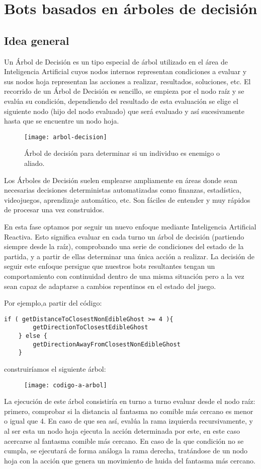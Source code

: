 \chapter{Bots basados en árboles de decisión}

\section{Idea general}
Un Árbol de Decisión es un tipo especial de árbol utilizado en el área de Inteligencia Artificial cuyos nodos internos representan condiciones a evaluar y sus nodos hoja representan las acciones a realizar, resultados, soluciones, etc. El recorrido de un Árbol de Decisión es sencillo, se empieza por el nodo raíz y se evalúa su condición, dependiendo del resultado de esta evaluación se elige el siguiente nodo (hijo del nodo evaluado) que será evaluado y así sucesivamente hasta que se encuentre un nodo hoja.
\begin{figure}[H]
\centering
\texttt{[image: arbol-decision]}
\caption{Árbol de decisión para determinar si un individuo es enemigo o aliado.}
\end{figure}

Los Árboles de Decisión suelen emplearse ampliamente en áreas donde sean necesarias decisiones deterministas automatizadas como finanzas, estadística, videojuegos, aprendizaje automático, etc. Son fáciles de entender y muy rápidos de procesar una vez construidos\cite{aihorizonDecisiontrees}.

En esta fase optamos por seguir un nuevo enfoque mediante Inteligencia Artificial Reactiva. Esto significa evaluar en cada turno un árbol de decisión (partiendo siempre desde la raíz), comprobando una serie de condiciones del estado de la partida, y a partir de ellas determinar una única acción a realizar. La decisión de seguir este enfoque persigue que nuestros bots resultantes tengan un comportamiento con continuidad dentro de una misma situación pero a la vez sean capaz de adaptarse a cambios repentinos en el estado del juego. 
 
Por ejemplo,a partir del código:
\begin{lstlisting}[frame=single, breaklines=no, basicstyle=\fontsize{10}{11}\ttfamily]
    if ( getDistanceToClosestNonEdibleGhost >= 4 ){
        getDirectionToClosestEdibleGhost
    } else {
        getDirectionAwayFromClosestNonEdibleGhost
    }
\end{lstlisting}

construiríamos el siguiente árbol:
\begin{figure}[H]
\centering
\texttt{[image: codigo-a-arbol]}
\end{figure}
La ejecución de este árbol consistiría en turno a turno evaluar desde el nodo raíz: primero, comprobar si la distancia al fantasma no comible más cercano es menor o igual que 4. En caso de que sea así, evalúa la rama izquierda recursivamente, y al ser esta un nodo hoja ejecuta la acción determinada por este, en este caso acercarse al fantasma comible más cercano. En caso de la que condición no se cumpla, se ejecutará de forma análoga la rama derecha, tratándose de un nodo hoja con la acción que genera un movimiento de huida del fantasma más cercano. 

